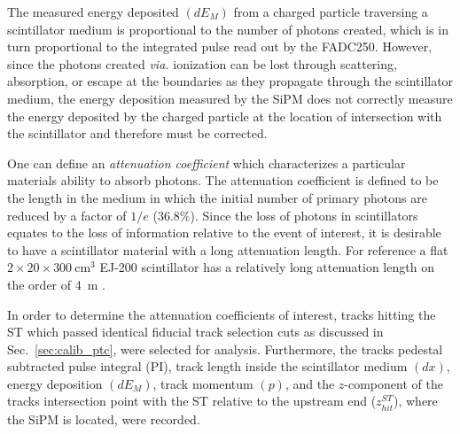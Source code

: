 The measured energy deposited $(dE_{M})$ from a charged particle traversing a scintillator medium is proportional to the number of photons created, which is in turn proportional to the integrated pulse read out by the FADC250. However, since the photons created \textit{via.} ionization can be lost through scattering, absorption, or escape at the boundaries as they propagate through the scintillator medium, the energy deposition measured by the SiPM does not correctly measure the energy deposited by the charged particle at the location of intersection with the scintillator and therefore must be corrected.


One can define an \textit{attenuation coefficient} which characterizes a particular materials ability to absorb photons. The attenuation coefficient is defined to be the length in the medium in which the initial number of primary photons are reduced by a factor of $1/e$ (36.8\%).  Since the loss of photons in scintillators equates to the loss of information relative to the event of interest, it is desirable to have a scintillator material with a long attenuation length.  For reference a flat $2 \times 20 \times 300\ \mathrm{cm^{3}}$ EJ-200 scintillator has a relatively long attenuation length on the order of 4~m \cite{ej200_specs}.

In order to determine the attenuation coefficients of interest, tracks hitting the ST which passed identical fiducial track selection cuts as discussed in Sec.~\ref{sec:calib_ptc}, were selected for analysis.  Furthermore, the tracks pedestal subtracted pulse integral (PI), track length inside the scintillator medium $(dx)$, energy deposition $(dE_{M})$, track momentum $(p)$, and the $z$-component of the tracks intersection point with the ST relative to the upstream end ($z^{ST}_{hit}$), where the SiPM is located, were recorded.  

